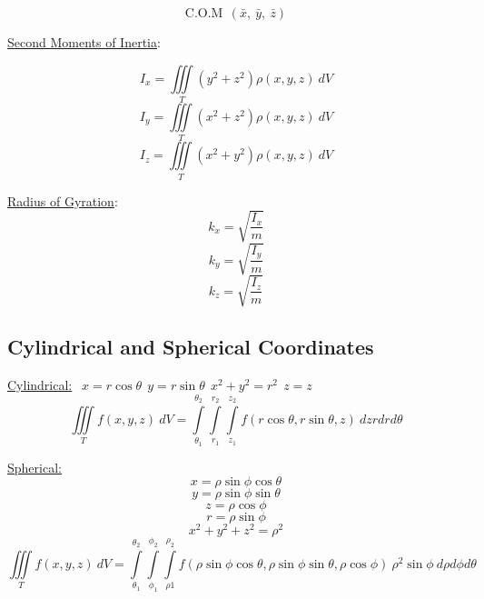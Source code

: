 \documentclass[12pt]{article}
\numberwithin{equation}{subsection}
\newcommand{\inda}{\hspace{.5cm}}
\begin{document}
\begin{flushleft}
\begin{equation}
\textrm{C.O.M}\ \ (\bar{x},\ \bar{y},\ \bar{z})
\end{equation}

\noindent \underline{Second Moments of Inertia}:

\begin{equation}
I_x = \iiint \limits_T  (y^2+z^2)\rho (x,y,z)\ dV
\end{equation}
\begin{equation}
I_y = \iiint \limits_T  (x^2+z^2)\rho (x,y,z)\ dV
\end{equation}
\begin{equation}
I_z = \iiint \limits_T  (x^2+y^2)\rho (x,y,z)\ dV
\end{equation}

\noindent \underline{Radius of Gyration}:
\begin{equation}
k_x = \sqrt{\frac{I_x}{m}}
\end{equation}
\begin{equation}
k_y = \sqrt{\frac{I_y}{m}}
\end{equation}
\begin{equation}
k_z = \sqrt{\frac{I_z}{m}}
\end{equation}


\newpage
\subsection{Cylindrical and Spherical Coordinates}


\inda \underline{Cylindrical:} $\ \ x=r\cos\theta \ \ y=r\sin\theta \ \ x^2+y^2=r^2 \ \ z=z $
\begin{equation}
\iiint \limits_T  f(x,y,z)\ dV = \int \limits_{\theta_1}^{\theta_2} \int \limits_{r_1}^{r_2} \int \limits_{z_1}^{z_2} f(r\cos\theta,r\sin\theta, z)\ dz rdrd\theta
\end{equation}

\inda \underline{Spherical:}
$$ x=\rho\sin\phi\cos\theta$$
$$ y=\rho\sin\phi\sin\theta$$
$$ z=\rho\cos\phi$$
$$ r=\rho\sin\phi$$
$$ x^2+y^2+z^2=\rho^2$$
\begin{equation}
\iiint \limits_T  f(x,y,z)\ dV = \int \limits_{\theta_1}^{\theta_2} \int \limits_{\phi_1}^{\phi_2} \int \limits_{\rho1}^{\rho_2} f(\rho\sin\phi\cos\theta,\rho\sin\phi\sin\theta, \rho\cos\phi)\ \rho^2\sin\phi\ d\rho d\phi d\theta
\end{equation}



\end{flushleft}
\end{document}
